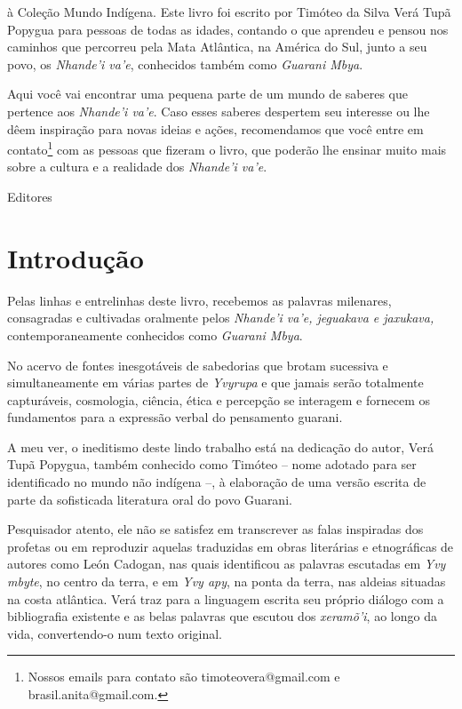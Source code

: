  

 à Coleção Mundo
Indígena. Este livro foi escrito por Timóteo da Silva
Verá Tupã Popygua para pessoas de todas as
idades, contando o que aprendeu e pensou nos caminhos que
percorreu pela Mata Atlântica, na América do Sul, junto a seu
povo, os \textit{Nhande'i va'e}, conhecidos também
como \textit{Guarani Mbya}.

 

Aqui você vai encontrar uma pequena parte de um mundo de saberes
que pertence aos \textit{Nhande'i va'e}. Caso esses saberes
despertem seu interesse ou lhe dêem inspiração para novas ideias e
ações, recomendamos que você entre em
contato\footnote{ Nossos emails para contato são timoteovera@gmail.com
e brasil.anita@gmail.com.} com as pessoas que fizeram o livro, que
poderão lhe ensinar muito mais sobre a cultura e a realidade
dos \textit{Nhande'i va'e}.
\medskip

\hfill Editores
 

\chapter{Introdução}

Pelas linhas e entrelinhas deste livro, recebemos as palavras milenares,
consagradas e cultivadas oralmente pelos \emph{Nhande’i va’e, jeguakava e jaxukava,}
contemporaneamente conhecidos como \emph{Guarani Mbya}.

No acervo de fontes
inesgotáveis de sabedorias que brotam sucessiva e simultaneamente em várias
partes de \emph{Yvyrupa} e que jamais serão totalmente capturáveis, cosmologia,
ciência, ética e percepção se interagem e fornecem os fundamentos para a
expressão verbal do pensamento guarani.

A meu ver, o ineditismo deste lindo
trabalho está na dedicação do autor, Verá Tupã Popygua, também conhecido como
Timóteo – nome adotado para ser identificado no mundo não indígena –, à
elaboração de uma versão escrita de parte da sofisticada literatura oral do
povo Guarani.

Pesquisador atento, ele não se satisfez em transcrever as falas
inspiradas dos profetas ou em reproduzir aquelas traduzidas em obras literárias
e etnográficas de autores como León Cadogan, nas quais identificou as palavras
escutadas em \emph{Yvy mbyte}, no centro da terra, e em \emph{Yvy apy}, na ponta da terra,
nas aldeias situadas na costa atlântica. Verá traz para a linguagem escrita seu
próprio diálogo com a bibliografia existente e as belas palavras que escutou
dos \emph{xeramõ’i}, ao longo da vida, convertendo-o num texto original.

